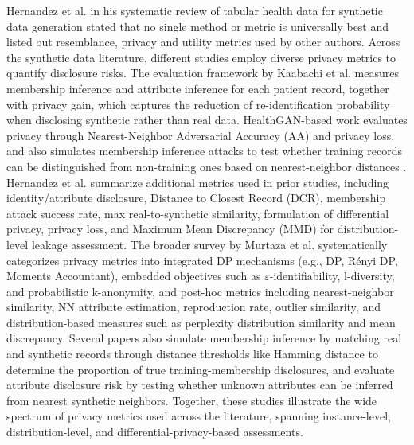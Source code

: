 \documentclass[master,proposal,extern,palatino]{rgseThesis}
\begin{document}
Hernandez et al. \cite{hernandez2022synthetic} in his systematic review of tabular health data for synthetic data generation stated that no single method or metric is universally best and listed out resemblance, privacy and utility metrics used by other authors.
\newline
Across the synthetic data literature, different studies employ diverse privacy metrics to quantify disclosure risks. The evaluation framework by Kaabachi et al. \cite{syninhospital} measures membership inference and attribute inference for each patient record, together with privacy gain, which captures the reduction of re-identification probability when disclosing synthetic rather than real data. HealthGAN-based work evaluates privacy through Nearest-Neighbor Adversarial Accuracy (AA) and privacy loss, and also simulates membership inference attacks to test whether training records can be distinguished from non-training ones based on nearest-neighbor distances \cite{yale2020synthesizing}. Hernandez et al. \cite{hernandez2022synthetic} summarize additional metrics used in prior studies, including identity/attribute disclosure, Distance to Closest Record (DCR), membership attack success rate, max real-to-synthetic similarity, formulation of differential privacy, privacy loss, and Maximum Mean Discrepancy (MMD) for distribution-level leakage assessment. The broader survey by Murtaza et al. \cite{Murtaza2023} systematically categorizes privacy metrics into integrated DP mechanisms (e.g., DP, Rényi DP, Moments Accountant), embedded objectives such as $\varepsilon$-identifiability, l-diversity, and probabilistic k-anonymity, and post-hoc metrics including nearest-neighbor similarity, NN attribute estimation, reproduction rate, outlier similarity, and distribution-based measures such as perplexity distribution similarity and mean discrepancy. Several papers also simulate membership inference by matching real and synthetic records through distance thresholds like Hamming distance \cite{goncalves2020generation} to determine the proportion of true training-membership disclosures, and evaluate attribute disclosure risk by testing whether unknown attributes can be inferred from nearest synthetic neighbors. Together, these studies illustrate the wide spectrum of privacy metrics used across the literature, spanning instance-level, distribution-level, and differential-privacy-based assessments.
\newline
\end{document}
